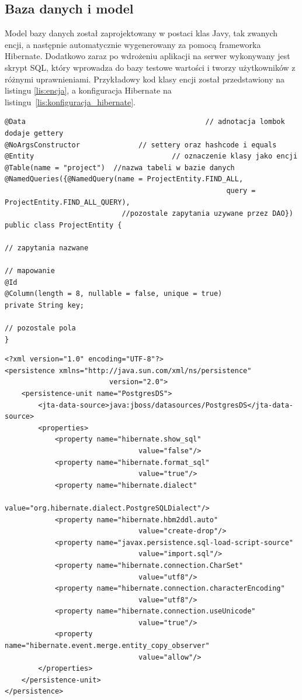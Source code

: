 \subsection{Baza danych i model}
Model bazy danych został zaprojektowany w postaci klas Javy, tak zwanych encji, a następnie automatycznie wygenerowany za pomocą frameworka Hibernate. Dodatkowo zaraz po wdrożeniu aplikacji na serwer wykonywany jest skrypt SQL, który wprowadza do bazy testowe wartości i tworzy użytkowników z różnymi uprawnieniami. Przykładowy kod klasy encji został przedstawiony na listingu \ref{lis:encja}, a konfiguracja Hibernate na listingu~\ref{lis:konfiguracja_hibernate}.

\begin{lstlisting}[caption={Przykładowa klasa encji}, label=lis:encja, numbers=none]
@Data									 		// adnotacja lombok dodaje gettery
@NoArgsConstructor 				// settery oraz hashcode i equals
@Entity				  	 		 		// oznaczenie klasy jako encji
@Table(name = "project")  //nazwa tabeli w bazie danych
@NamedQueries({@NamedQuery(name = ProjectEntity.FIND_ALL, 
													 query = ProjectEntity.FIND_ALL_QUERY),
   							//pozostale zapytania uzywane przez DAO})
public class ProjectEntity {

// zapytania nazwane

// mapowanie
@Id
@Column(length = 8, nullable = false, unique = true)
private String key;

// pozostale pola
}\end{lstlisting}
\newpage
\begin{lstlisting}[caption={Konfiguracja Hibernate}, label=lis:konfiguracja_hibernate, numbers=none]
<?xml version="1.0" encoding="UTF-8"?>
<persistence xmlns="http://java.sun.com/xml/ns/persistence"
					 	 version="2.0">
	<persistence-unit name="PostgresDS">
		<jta-data-source>java:jboss/datasources/PostgresDS</jta-data-source>
		<properties>
			<property name="hibernate.show_sql" 
								value="false"/>
			<property name="hibernate.format_sql" 
								value="true"/>
			<property name="hibernate.dialect" 
								value="org.hibernate.dialect.PostgreSQLDialect"/>
			<property name="hibernate.hbm2ddl.auto" 
								value="create-drop"/>
			<property name="javax.persistence.sql-load-script-source" 
								value="import.sql"/>
			<property name="hibernate.connection.CharSet" 
								value="utf8"/>
			<property name="hibernate.connection.characterEncoding" 
								value="utf8"/>
			<property name="hibernate.connection.useUnicode" 
								value="true"/>
			<property name="hibernate.event.merge.entity_copy_observer" 
								value="allow"/>
		</properties>
	</persistence-unit>
</persistence>\end{lstlisting}

